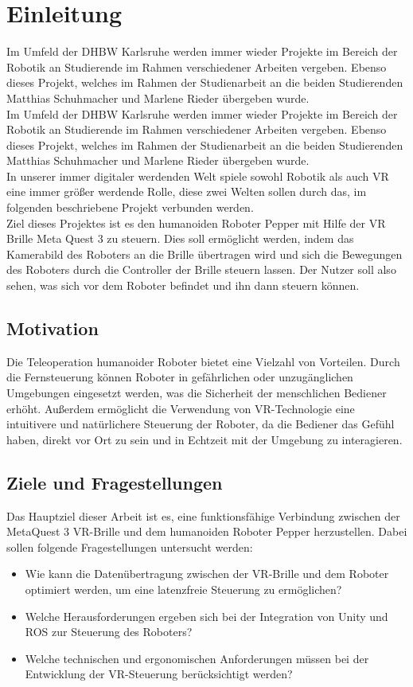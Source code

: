 \chapter{Einleitung}
Im Umfeld der \ac{DHBW} Karlsruhe werden immer wieder Projekte im Bereich der Robotik an Studierende im Rahmen verschiedener Arbeiten vergeben. Ebenso dieses Projekt, welches im Rahmen der Studienarbeit an die beiden Studierenden Matthias Schuhmacher und Marlene Rieder übergeben wurde. 
\\

\noindent
Im Umfeld der \ac{DHBW} Karlsruhe werden immer wieder Projekte im Bereich der Robotik an Studierende im Rahmen verschiedener Arbeiten vergeben. Ebenso dieses Projekt, welches im Rahmen der Studienarbeit an die beiden Studierenden Matthias Schuhmacher und Marlene Rieder übergeben wurde.
\\

\noindent 
In unserer immer digitaler werdenden Welt spiele sowohl Robotik als auch \ac{VR} eine immer größer werdende Rolle, diese zwei Welten sollen durch das, im folgenden beschriebene Projekt verbunden werden.
\\

\noindent
Ziel dieses Projektes ist es den humanoiden Roboter Pepper mit Hilfe der \ac{VR} Brille Meta Quest 3 zu steuern. Dies soll ermöglicht werden, indem das Kamerabild des Roboters an die Brille übertragen wird und sich die Bewegungen des Roboters durch die Controller der Brille steuern lassen. Der Nutzer soll also sehen, was sich vor dem Roboter befindet und ihn dann steuern können.

\section{Motivation}
Die Teleoperation humanoider Roboter bietet eine Vielzahl von Vorteilen. Durch die Fernsteuerung können Roboter in gefährlichen oder unzugänglichen Umgebungen eingesetzt werden, was die Sicherheit der menschlichen Bediener erhöht. Außerdem ermöglicht die Verwendung von VR-Technologie eine intuitivere und natürlichere Steuerung der Roboter, da die Bediener das Gefühl haben, direkt vor Ort zu sein und in Echtzeit mit der Umgebung zu interagieren.

\section{Ziele und Fragestellungen}
Das Hauptziel dieser Arbeit ist es, eine funktionsfähige Verbindung zwischen der MetaQuest 3 VR-Brille und dem humanoiden Roboter Pepper herzustellen. Dabei sollen folgende Fragestellungen untersucht werden:
\begin{itemize}
    \item Wie kann die Datenübertragung zwischen der VR-Brille und dem Roboter optimiert werden, um eine latenzfreie Steuerung zu ermöglichen?
    \item Welche Herausforderungen ergeben sich bei der Integration von Unity und ROS zur Steuerung des Roboters?
    \item Welche technischen und ergonomischen Anforderungen müssen bei der Entwicklung der VR-Steuerung berücksichtigt werden?
\end{itemize}


